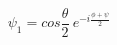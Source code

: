 \begin{equation}
\psi_1= cos \frac{\theta}{2}~e^{-i\frac{\phi+\psi}{2}} \label{eq:deellibes}
\end{equation}

